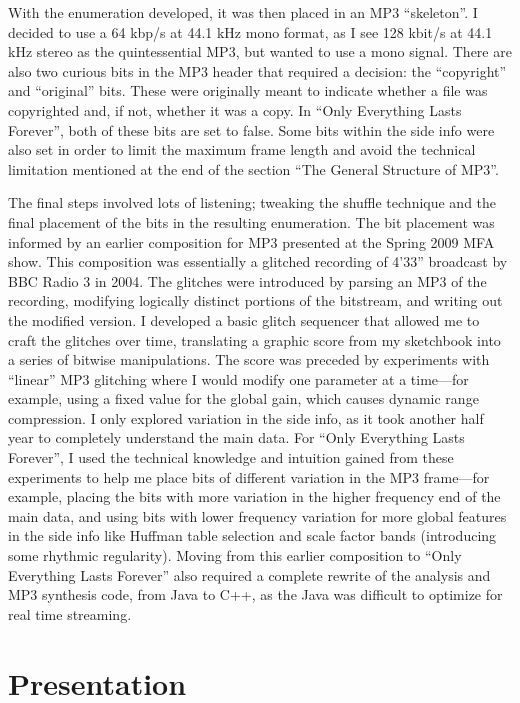 \documentclass{thesis}
\begin{document}
With the enumeration developed, it was then placed in an MP3 ``skeleton''. I decided to use a 64 kbp/s at 44.1 kHz mono format, as I see 128 kbit/s at 44.1 kHz stereo as the quintessential MP3, but wanted to use a mono signal. There are also two curious bits in the MP3 header that required a decision: the ``copyright'' and ``original'' bits. These were originally meant to indicate whether a file was copyrighted and, if not, whether it was a copy. In ``Only Everything Lasts Forever'', both of these bits are set to false. Some bits within the side info were also set in order to limit the maximum frame length and avoid the technical limitation mentioned at the end of the section ``The General Structure of MP3''.

The final steps involved lots of listening; tweaking the shuffle technique and the final placement of the bits in the resulting enumeration. The bit placement was informed by an earlier composition for MP3 presented at the Spring 2009 MFA show. This composition was essentially a glitched recording of 4'33'' broadcast by BBC Radio 3 in 2004\cite{_radio_2004}. The glitches were introduced by parsing an MP3 of the recording, modifying logically distinct portions of the bitstream, and writing out the modified version. I developed a basic glitch sequencer that allowed me to craft the glitches over time, translating a graphic score from my sketchbook into a series of bitwise manipulations. The score was preceded by experiments with ``linear'' MP3 glitching where I would modify one parameter at a time---for example, using a fixed value for the global gain, which causes dynamic range compression. I only explored variation in the side info, as it took another half year to completely understand the main data. For ``Only Everything Lasts Forever'', I used the technical knowledge and intuition gained from these experiments to help me place bits of different variation in the MP3 frame---for example, placing the bits with more variation in the higher frequency end of the main data, and using bits with lower frequency variation for more global features in the side info like Huffman table selection and scale factor bands (introducing some rhythmic regularity). Moving from this earlier composition to ``Only Everything Lasts Forever'' also required a complete rewrite of the analysis and MP3 synthesis code, from Java to C++, as the Java was difficult to optimize for real time streaming.

\section{Presentation}
\end{document}
